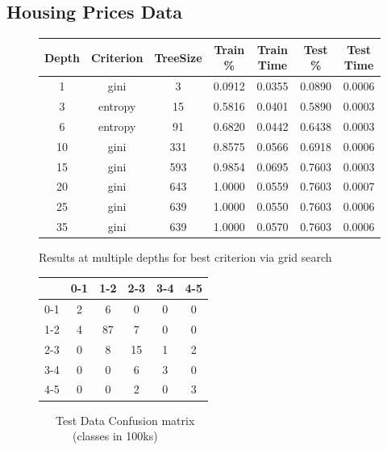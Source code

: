 \documentclass[h]{article}
\begin{document}
\subsection*{Housing Prices Data}
\begin{figure}[H]
\begin{tabular}{ | c | c  | c | c | c | c | c |} 
\hline
\textbf{Depth} & \textbf{Criterion} & \textbf{TreeSize} & \textbf{Train \%} & \textbf{Train Time} & \textbf{Test \%} & \textbf{Test Time}   \\
\hline
1 & gini & 3 & 0.0912 & 0.0355 & 0.0890 & 0.0006 \\ \hline
3 & entropy & 15 & 0.5816 & 0.0401 & 0.5890 & 0.0003 \\ \hline
6 & entropy & 91 & 0.6820 & 0.0442 & 0.6438 & 0.0003 \\ \hline
10 & gini & 331 & 0.8575 & 0.0566 & 0.6918 & 0.0006 \\ \hline
15 & gini & 593 & 0.9854 & 0.0695 & 0.7603 & 0.0003 \\ \hline
20 & gini & 643 & 1.0000 & 0.0559 & 0.7603 & 0.0007 \\ \hline
25 & gini & 639 & 1.0000 & 0.0550 & 0.7603 & 0.0006 \\ \hline
35 & gini & 639 & 1.0000 & 0.0570 & 0.7603 & 0.0006 \\ \hline

\end{tabular}
\caption*{Results at multiple depths for best criterion via grid search}
\endminipage\hfill
{}
\begin{flushright}
\begin{tabular}{ | c | c | c  | c | c | c | } 
\hline
 & 0-1 & 1-2 & 2-3 & 3-4 & 4-5  \\
\hline
0-1 & 2 & 6 & 0 & 0 & 0 \\ \hline 
1-2 & 4 & 87 & 7 & 0 & 0 \\ \hline 
2-3 & 0 & 8 & 15 & 1 & 2 \\ \hline 
3-4 & 0 & 0 & 6 & 3 & 0 \\ \hline 
4-5 & 0 & 0 & 2 & 0 & 3 \\ \hline 
\end{tabular}
\caption*{  \ \ \  Test Data Confusion matrix  \\  \ \ \ \ \ \ (classes in 100ks)}
\end{flushright}
\endminipage\hfill

\end{figure}
\end{document}
